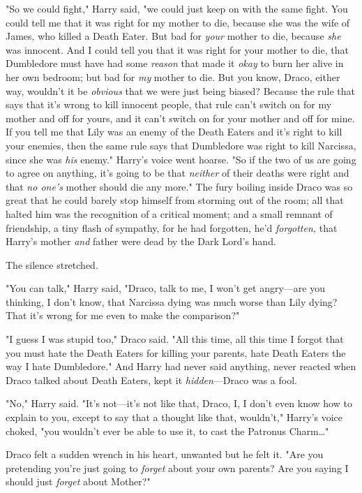 "So we could fight," Harry said, "we could just keep on with the same fight. 
You could tell me that it was right for my mother to die, because she was the 
wife of James, who killed a Death Eater. But bad for \emph{your} mother to die, 
because \emph{she} was innocent. And I could tell you that it was right for 
your mother to die, that Dumbledore must have had some \emph{reason} that made 
it \emph{okay} to burn her alive in her own bedroom; but bad for \emph{my} 
mother to die. But you know, Draco, either way, wouldn't it be \emph{obvious} 
that we were just being biased? Because the rule that says that it's wrong to 
kill innocent people, that rule can't switch on for my mother and off for 
yours, and it can't switch on for your mother and off for mine. If you tell me 
that Lily was an enemy of the Death Eaters and it's right to kill your enemies, 
then the same rule says that Dumbledore was right to kill Narcissa, since she 
was \emph{his} enemy." Harry's voice went hoarse. "So if the two of us are 
going to agree on anything, it's going to be that \emph{neither} of their 
deaths were right and that \emph{no one's} mother should die any more."
\sbreak
The fury boiling inside Draco was so great that he could barely stop himself 
from storming out of the room; all that halted him was the recognition of a 
critical moment; and a small remnant of friendship, a tiny flash of sympathy, 
for he had forgotten, he'd \emph{forgotten,} that Harry's mother \emph{and} 
father were dead by the Dark Lord's hand.

The silence stretched.

"You can talk," Harry said, "Draco, talk to me, I won't get angry---are you 
thinking, I don't know, that Narcissa dying was much worse than Lily dying? 
That it's wrong for me even to make the comparison?"

"I guess I was stupid too," Draco said. "All this time, all this time I forgot 
that you must hate the Death Eaters for killing your parents, hate Death Eaters 
the way I hate Dumbledore." And Harry had never said anything, never reacted 
when Draco talked about Death Eaters, kept it \emph{hidden}---Draco was a fool.

"No," Harry said. "It's not---it's not like that, Draco, I, I don't even know 
how to explain to you, except to say that a thought like that, wouldn't," 
Harry's voice choked, "you wouldn't ever be able to use it, to cast the 
Patronus Charm{\ldots}"

Draco felt a sudden wrench in his heart, unwanted but he felt it. "Are you 
pretending you're just going to \emph{forget} about your own parents? Are you 
saying I should just \emph{forget} about Mother?"

